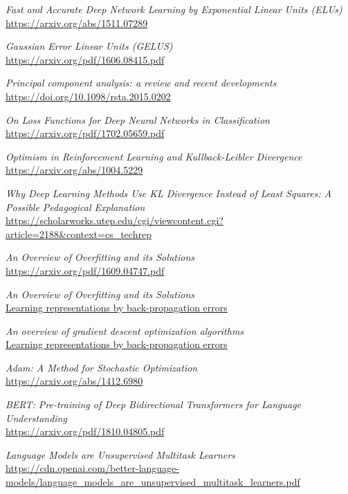 \begin{thebibliography}{99}
\textit{Fast and Accurate Deep Network Learning by Exponential Linear Units (ELUs)}
\\\url{https://arxiv.org/abs/1511.07289}

\textit{Gaussian Error Linear Units (GELUS)}
\\\url{https://arxiv.org/pdf/1606.08415.pdf}

\textit{Principal component analysis: a review and recent developments}
\\\url{https://doi.org/10.1098/rsta.2015.0202}




\textit{On Loss Functions for Deep Neural Networks
in Classification}
\\\url{https://arxiv.org/pdf/1702.05659.pdf}

\textit{Optimism in Reinforcement Learning and Kullback-Leibler Divergence
}
\\\url{https://arxiv.org/abs/1004.5229}

\textit{Why Deep Learning Methods Use KL Divergence
Instead of Least Squares: A Possible Pedagogical
Explanation}
\\\url{https://scholarworks.utep.edu/cgi/viewcontent.cgi?article=2188&context=cs_techrep}



\textit{An Overview of Overfitting and its Solutions}
\\\url{https://arxiv.org/pdf/1609.04747.pdf}


\textit{An Overview of Overfitting and its Solutions}
\\\url{Learning representations by back-propagation errors}

\textit{An overview of gradient descent optimization
algorithms}
\\\url{Learning representations by back-propagation errors}

\textit{Adam: A Method for Stochastic Optimization}
\\\url{https://arxiv.org/abs/1412.6980}

\textit{BERT: Pre-training of Deep Bidirectional Transformers for
Language Understanding}
\\\url{https://arxiv.org/pdf/1810.04805.pdf}

\textit{Language Models are Unsupervised Multitask Learners}
\\\url{https://cdn.openai.com/better-language-models/language_models_are_unsupervised_multitask_learners.pdf}




\end{thebibliography}
